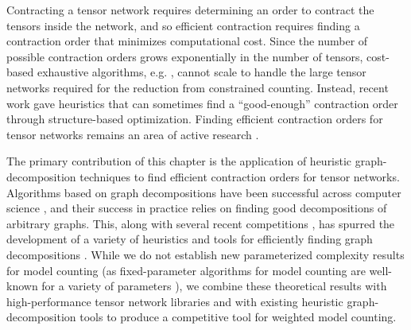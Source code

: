 

Contracting a tensor network requires determining an order to contract the tensors inside the network, and so efficient contraction requires finding a contraction order that minimizes computational cost. Since the number of possible contraction orders grows exponentially in the number of tensors, cost-based exhaustive algorithms, e.g. \cite{PHV14}, cannot scale to handle the large tensor networks required for the reduction from constrained counting. Instead, recent work \cite{KCMR18} gave heuristics that can sometimes find a ``good-enough'' contraction order through structure-based optimization. Finding efficient contraction orders for tensor networks remains an area of active research \cite{RTPCTSL19}.


The primary contribution of this chapter is the application of heuristic graph-decomposition techniques to find efficient contraction orders for tensor networks. Algorithms based on graph decompositions have been successful across computer science \cite{GLST17,MPPV04}, and their success in practice relies on finding good decompositions of arbitrary graphs. This, along with several recent competitions \cite{DKTW18}, has spurred the development of a variety of heuristics and tools for efficiently finding graph decompositions \cite{AMW17,HS18,Tamaki17}. While we do not establish new parameterized complexity results for model counting (as fixed-parameter algorithms for model counting are well-known for a variety of parameters \cite{FMR08,SS10}), we combine these theoretical results with high-performance tensor network libraries and with existing heuristic graph-decomposition tools to produce a competitive tool for weighted model counting.

